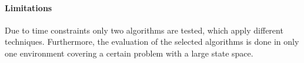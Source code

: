 \paragraph{Limitations}
\label{sec:limitations}

Due to time constraints only two algorithms are tested, which apply different techniques. Furthermore, the evaluation of the selected algorithms is done in only one environment covering a certain problem with a large state space. 
